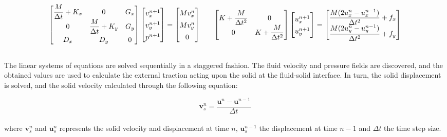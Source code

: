 \documentclass{article}
\begin{document}
\[
\begin{array}{c@{\qquad}c}
	\begin{bmatrix}
		\dfrac{M}{\Delta t} + K_x & 0 & G_x \\
		0 & \dfrac{M}{\Delta t} + K_y & G_y \\
		D_x & D_y & 0
	\end{bmatrix}
	{\renewcommand{\arraystretch}{1.4}
		\begin{bmatrix}
			v_x^{n+1} \\
			v_y^{n+1} \\
			p^{n+1}
		\end{bmatrix}
	}
	=
	{\renewcommand{\arraystretch}{1.4}
		\begin{bmatrix}
			M v_x^n \\
			M v_y^n \\
			0
		\end{bmatrix}
	}
	&
	\begin{bmatrix}
		K + \dfrac{M}{\Delta t^2} & 0 \\
		0 & K + \dfrac{M}{\Delta t^2}
	\end{bmatrix}
	{\renewcommand{\arraystretch}{1.4}
		\begin{bmatrix}
			u^{n+1}_x \\
			u^{n+1}_y
		\end{bmatrix}
	}
	=
	{\renewcommand{\arraystretch}{1.4}
		\begin{bmatrix}
			\dfrac{M (2 u_x^n - u_x^{n-1})}{\Delta t^2} + f_x \\
			\dfrac{M (2 u_y^n - u_y^{n-1})}{\Delta t^2} + f_y
		\end{bmatrix}
	}
\end{array}
\] \\

The linear systems of equations are solved sequentially in a staggered fashion. The fluid velocity and pressure fields are discovered, and the obtained values are used to calculate the external traction acting upon the solid at the fluid-solid interface. In turn, the solid displacement is solved, and the solid velocity calculated through the following equation:

\begin{equation}
	\mathbf{v}_s^n = \frac{\mathbf{u}^n - \mathbf{u}^{n-1}}{\Delta t}
\end{equation} \\

\noindent where $\mathbf{v}_s^n$ and $\mathbf{u}_s^n$ represents the solid velocity and displacement at time $n$, $\mathbf{u}_s^{n-1}$ the displacement at time $n-1$ and $\Delta t$ the time step size.
\end{document}
